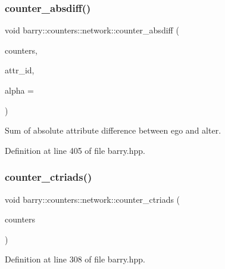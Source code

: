 \subsubsection{\texorpdfstring{counter\+\_\+absdiff()}{counter\_absdiff()}}
{\footnotesize\ttfamily void barry\+::counters\+::network\+::counter\+\_\+absdiff (\begin{DoxyParamCaption}\item[{\hyperlink{namespacebarry_1_1counters_1_1network_aa72fdb34752ac24167a06ee196a8fff6}{Net\+Counters} $\ast$}]{counters,  }\item[{\hyperlink{namespacebarry_a11dfc53ddb4672278319aa04f1e09a6c}{uint}}]{attr\+\_\+id,  }\item[{double}]{alpha = {} }\end{DoxyParamCaption})\hspace{0.3cm}{\ttfamily [inline]}}



Sum of absolute attribute difference between ego and alter. 



Definition at line 405 of file barry.\+hpp.

\mbox{\label{namespacebarry_1_1counters_1_1network_af04b15d38a744b0e741005c44b581368}} 
\subsubsection{\texorpdfstring{counter\+\_\+ctriads()}{counter\_ctriads()}}
{\footnotesize\ttfamily void barry\+::counters\+::network\+::counter\+\_\+ctriads (\begin{DoxyParamCaption}\item[{\hyperlink{namespacebarry_1_1counters_1_1network_aa72fdb34752ac24167a06ee196a8fff6}{Net\+Counters} $\ast$}]{counters }\end{DoxyParamCaption})\hspace{0.3cm}{\ttfamily [inline]}}



Definition at line 308 of file barry.\+hpp.

\mbox{\label{namespacebarry_1_1counters_1_1network_a3d7953d9b68c547fc0d02cc1f6fadb23}} 
